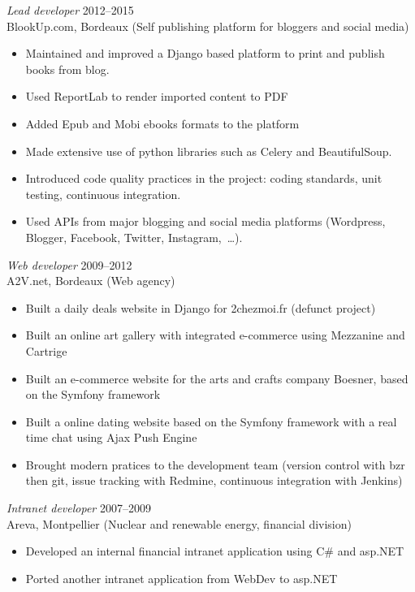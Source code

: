 \documentclass[line,resmargin]{res}
\begin{document}
\begin{resume}
{\sl Lead developer\/} \hfill 2012--2015\\
BlookUp.com, Bordeaux (Self publishing platform for bloggers and social media)
\begin{itemize} \itemsep -2pt
    \item Maintained and improved a Django based platform to print and publish books from blog.
    \item Used ReportLab to render imported content to PDF
    \item Added Epub and Mobi ebooks formats to the platform
    \item Made extensive use of python libraries such as Celery and BeautifulSoup.
    \item Introduced code quality practices in the project: coding standards, unit testing, continuous integration.
    \item Used APIs from major blogging and social media platforms (Wordpress, Blogger, Facebook, Twitter, Instagram, …).
\end{itemize}

{\sl Web developer\/} \hfill 2009--2012 \\
A2V.net, Bordeaux (Web agency)
\begin{itemize}  \itemsep -2pt
    \item Built a daily deals website in Django for 2chezmoi.fr (defunct project)
    \item Built an online art gallery with integrated e-commerce using Mezzanine and Cartrige
    \item Built an e-commerce website for the arts and crafts company Boesner, based on the Symfony framework
    \item Built a online dating website based on the Symfony framework with a real time chat using Ajax Push Engine
    \item Brought modern pratices to the development team (version control with bzr then git,
        issue tracking with Redmine, continuous integration with Jenkins)
\end{itemize}

{\sl Intranet developer\/} \hfill 2007--2009 \\
Areva, Montpellier (Nuclear and renewable energy, financial division)
\begin{itemize} \itemsep -2pt
    \item Developed an internal financial intranet application using C\# and asp.NET
    \item Ported another intranet application from WebDev to asp.NET
\end{itemize}


\end{resume}
\end{document}
